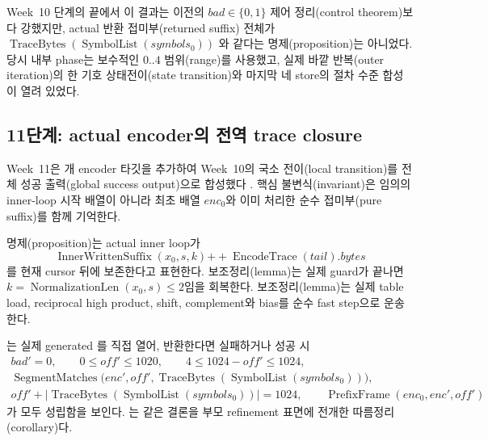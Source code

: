 Week~10 단계의 끝에서 이 결과는 이전의 \(bad\in\{0,1\}\) 제어
정리(control theorem)보다 강했지만, actual 반환 접미부(returned suffix) 전체가
\(
\operatorname{TraceBytes}
  (\operatorname{SymbolList}(symbols_0))
\)
와 같다는 명제(proposition)는 아니었다. 당시 내부 phase는 보수적인 \(0..4\)
범위(range)를 사용했고, 실제 바깥 반복(outer iteration)의 한 기호
상태전이(state transition)와 마지막 네 store의 절차 수준 합성이 열려 있었다.

\subsection{11단계: actual encoder의 전역 trace closure}

Week~11은 \WeekElevenTargetCount 개 encoder 타깃을 추가하여 Week~10의 국소
전이(local transition)를 전체 성공 출력(global success output)으로 합성했다
\cite{week11-report,rans-encoder-invariant}. 핵심 불변식(invariant)은 임의의
inner-loop 시작 배열이 아니라 최초 배열 \(enc_0\)와 이미 처리한 순수
접미부(pure suffix)를 함께 기억한다.

\begin{verified}
 명제(proposition)는 actual inner loop가
\[
  \operatorname{InnerWrittenSuffix}(x_0,s,k)
  \mathbin{+\!\!+}\operatorname{EncodeTrace}(tail).bytes
\]
를 현재 cursor 뒤에 보존한다고 표현한다.
 보조정리(lemma)는 실제 guard가
끝나면 \(k=\operatorname{NormalizationLen}(x_0,s)\le2\)임을 회복한다.
 보조정리(lemma)는 실제 table
load, reciprocal high product, shift, complement와 bias를 순수 fast step으로
운송한다.
\end{verified}

\begin{verified}
는 실제 generated
를 직접 열어, 반환한다면 실패하거나
성공 시
\[
\begin{gathered}
  bad'=0,\qquad 0\le off'\le1020,\qquad
  4\le1024-off'\le1024,\\
  \operatorname{SegmentMatches}
    \bigl(enc',off',
      \operatorname{TraceBytes}(\operatorname{SymbolList}(symbols_0))\bigr),\\
  off'+\left|
    \operatorname{TraceBytes}(\operatorname{SymbolList}(symbols_0))
  \right|=1024,\qquad
  \operatorname{PrefixFrame}(enc_0,enc',off')
\end{gathered}
\]
가 모두 성립함을 보인다.
는 같은 결론을 부모
refinement 표면에 전개한 따름정리(corollary)다.
\end{verified}


